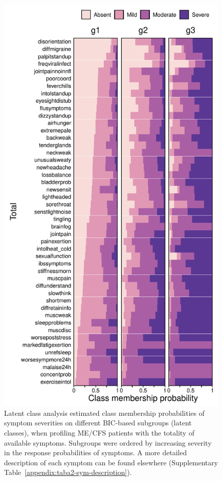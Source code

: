 \begin{figure}[h]
    \centering
    \includegraphics[height=0.7\paperheight]{chapter/2024-sym-domains/figures/figa2-lca-response-probabilities-bic-total-absent.pdf}
    \caption[Latent class analysis estimated class membership probabilities of symptom severities on different BIC-based subgroups, when profiling ME/CFS patients with the totality of available symptoms]{Latent class analysis estimated class membership probabilities of symptom severities on different BIC-based subgroups (latent classes), when profiling ME/CFS patients with the totality of available symptoms. Subgroups were ordered by increasing severity in the response probabilities of symptoms. A more detailed description of each symptom can be found elsewhere (Supplementary Table~\ref{appendix:taba2-sym-description}).}
    \label{appendix:figa2-lca-response-probabilities-bic-total-absent}
\end{figure}


